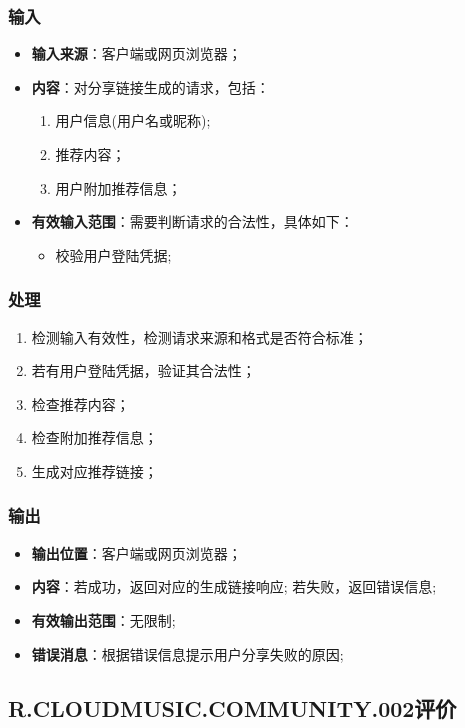 \subsubsection{输入}
	\begin{itemize}
		\item \textbf{输入来源}：客户端或网页浏览器；
		\item \textbf{内容}：对分享链接生成的请求，包括：
		\begin{enumerate}
			\item 用户信息(用户名或昵称);
			\item 推荐内容；
			\item 用户附加推荐信息；
		\end{enumerate}
		\item \textbf{有效输入范围}：需要判断请求的合法性，具体如下：
		\begin{itemize}
			\item 校验用户登陆凭据;
		\end{itemize}
	\end{itemize}
\subsubsection{处理}
	\begin{enumerate}
		\item 检测输入有效性，检测请求来源和格式是否符合标准；
		\item 若有用户登陆凭据，验证其合法性；
		\item 检查推荐内容；
		\item 检查附加推荐信息；
		\item 生成对应推荐链接；
	\end{enumerate}
\subsubsection{输出}
\begin{itemize}
	\item \textbf{输出位置}：客户端或网页浏览器；
	\item \textbf{内容}：若成功，返回对应的生成链接响应; 若失败，返回错误信息;
	\item \textbf{有效输出范围}：无限制;
	\item \textbf{错误消息}：根据错误信息提示用户分享失败的原因;
\end{itemize}

\subsection{R.CLOUDMUSIC.COMMUNITY.002评价}
